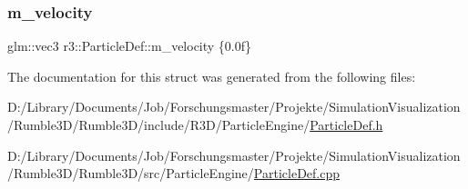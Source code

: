 \subsubsection{\texorpdfstring{m\+\_\+velocity}{m\_velocity}}
{\footnotesize\ttfamily glm\+::vec3 r3\+::\+Particle\+Def\+::m\+\_\+velocity \{0.\+0f\}}



The documentation for this struct was generated from the following files\+:\begin{DoxyCompactItemize}
\item 
D\+:/\+Library/\+Documents/\+Job/\+Forschungsmaster/\+Projekte/\+Simulation\+Visualization/\+Rumble3\+D/\+Rumble3\+D/include/\+R3\+D/\+Particle\+Engine/\mbox{\hyperlink{_particle_def_8h}{Particle\+Def.\+h}}\item 
D\+:/\+Library/\+Documents/\+Job/\+Forschungsmaster/\+Projekte/\+Simulation\+Visualization/\+Rumble3\+D/\+Rumble3\+D/src/\+Particle\+Engine/\mbox{\hyperlink{_particle_def_8cpp}{Particle\+Def.\+cpp}}\end{DoxyCompactItemize}
